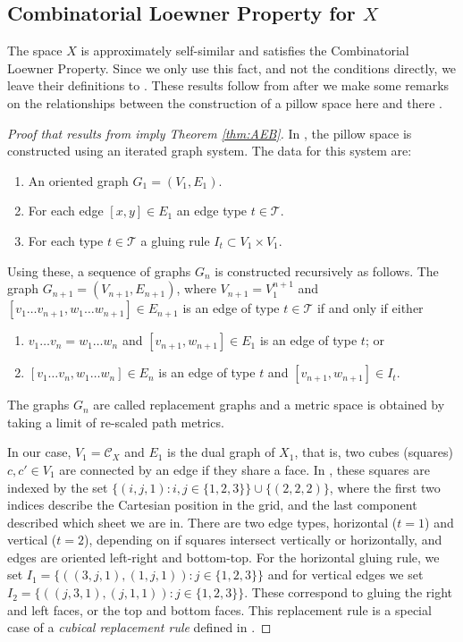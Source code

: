 \documentclass{amsart}
\theoremstyle{plain}
\theoremstyle{definition}
\numberwithin{equation}{section}
\numberwithin{theorem}{section}
\newcommand{\cC}{\mathcal{C}}
\begin{document}
\subsection{Combinatorial Loewner Property for $X$}
The space $X$ is approximately self-similar and satisfies the Combinatorial Loewner Property. Since we only use this fact, and not the conditions directly, we leave their definitions to \cite{AEBb}. These results follow from \cite{AEBb} after we make some remarks on the relationships between the construction of a pillow space here and there \cite[Example 4.3]{AEBb}.

\begin{proof}[Proof that results from \cite{AEBb} imply Theorem \ref{thm:AEB}] In \cite{AEBb}, the pillow space is constructed using an iterated graph system. The data for this system are:
\begin{enumerate}
    \item An oriented graph $G_1=(V_1,E_1)$.
    \item For each edge $[x,y]\in E_1$ an edge type $t\in \mathcal{T}$.
    \item For each type $t\in \mathcal{T}$ a gluing rule $I_t\subset V_1\times V_1$. 
\end{enumerate}
Using these, a sequence of graphs $G_n$ is constructed recursively as follows. The graph $G_{n+1}=(V_{n+1}, E_{n+1})$, where $V_{n+1}=V_1^{n+1}$ and $[v_1\dots v_{n+1}, w_{1}\dots w_{n+1}]\in E_{n+1}$ is an edge of type $t\in \mathcal{T}$ if and only if either
\begin{enumerate}
    \item $v_1\dots v_{n}=w_1\dots w_{n}$ and $[v_{n+1},w_{n+1}]\in E_1$ is an edge of type $t$; or
    \item $[v_1\dots v_{n},w_1\dots w_{n}]\in E_n$ is an edge of type $t$ and $[v_{n+1},w_{n+1}]\in I_t$.
\end{enumerate}
The graphs $G_n$ are called replacement graphs and a metric space is obtained by taking a limit of re-scaled path metrics.

In our case, $V_1 = \cC_X$ and $E_1$ is the dual graph of $X_1$, that is, two cubes (squares) $c,c'\in V_1$ are connected by an edge if they share a face.  In \cite[Example 4.3]{AEBb}, these squares are indexed by the set $\{(i,j,1): i,j\in \{1,2,3\}\}\cup \{(2,2,2)\}$, where the first two indices describe the Cartesian position in the grid, and the last component described which sheet we are in.  There are two edge types, horizontal ($t=1$) and vertical ($t=2$), depending on if squares intersect vertically or horizontally, and edges are oriented left-right and bottom-top. For the horizontal gluing rule, we set $I_1=\{((3,j,1),(1,j,1)) : j \in \{1,2,3\}\}$ and for vertical edges we set $I_2=\{((j,3,1),(j,1,1)) : j \in \{1,2,3\}\}$. These correspond to gluing the right and left faces, or the top and bottom faces. This replacement rule is a special case of a \emph{cubical replacement rule} defined in \cite[Section 4]{AEBb}.


\end{proof}
\end{document}
